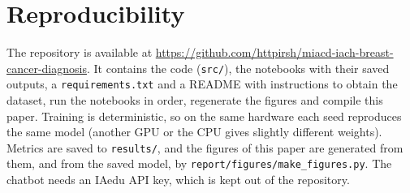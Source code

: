 \documentclass{article}
\begin{document}
\section*{Reproducibility}
The repository is available at
\url{https://github.com/httpirsh/miacd-iach-breast-cancer-diagnosis}. It contains the code (\texttt{src/}), the notebooks with their saved outputs, a
\texttt{requirements.txt} and a README with instructions to obtain the dataset, run the
notebooks in order, regenerate the figures and compile this paper. Training is deterministic, so on the same hardware each seed reproduces the same model
(another GPU or the CPU gives slightly different weights).
Metrics are saved to \texttt{results/}, and the figures of this paper are generated from
them, and from the saved model, by \texttt{report/figures/make\_figures.py}. The chatbot
needs an IAedu API key, which is kept out of the repository.




\end{document}
